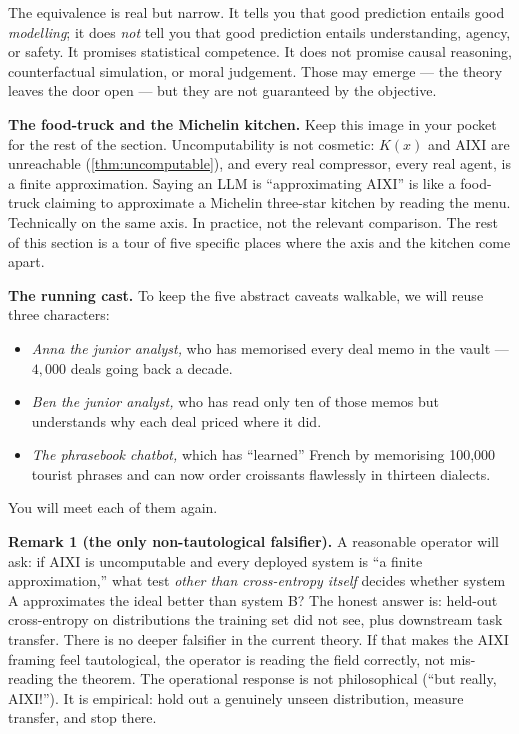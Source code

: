 \documentclass[12pt,a4paper]{article}
\theoremstyle{plain}
\theoremstyle{definition}
\begin{document}
\begin{intuition}
The equivalence is real but narrow. It tells you that good prediction
entails good \emph{modelling}; it does \emph{not} tell you that good
prediction entails understanding, agency, or safety. It promises
statistical competence. It does not promise causal reasoning,
counterfactual simulation, or moral judgement. Those may emerge ---
the theory leaves the door open --- but they are not guaranteed by
the objective.

\medskip

\noindent\textbf{The food-truck and the Michelin kitchen.} Keep this
image in your pocket for the rest of the section. Uncomputability is
not cosmetic: $K(x)$ and AIXI are unreachable
(\cref{thm:uncomputable}), and every real compressor, every real
agent, is a finite approximation. Saying an LLM is
``approximating AIXI'' is like a food-truck claiming to approximate
a Michelin three-star kitchen by reading the menu. Technically on
the same axis. In practice, not the relevant comparison. The rest
of this section is a tour of five specific places where the axis
and the kitchen come apart.

\medskip

\noindent\textbf{The running cast.} To keep the five abstract
caveats walkable, we will reuse three characters:

\begin{itemize}[leftmargin=1.2em,itemsep=2pt]
  \item \emph{Anna the junior analyst,} who has memorised every deal
        memo in the vault --- $4{,}000$ deals going back a decade.
  \item \emph{Ben the junior analyst,} who has read only ten of those
        memos but understands why each deal priced where it did.
  \item \emph{The phrasebook chatbot,} which has ``learned'' French by
        memorising 100{,}000 tourist phrases and can now order
        croissants flawlessly in thirteen dialects.
\end{itemize}

You will meet each of them again.

\medskip

\noindent\textbf{Remark 1 (the only non-tautological falsifier).}
A reasonable operator will ask: if AIXI is uncomputable and every
deployed system is ``a finite approximation,'' what test \emph{other
than cross-entropy itself} decides whether system A approximates the
ideal better than system B? The honest answer is: held-out
cross-entropy on distributions the training set did not see, plus
downstream task transfer. There is no deeper falsifier in the
current theory. If that makes the AIXI framing feel tautological,
the operator is reading the field correctly, not mis-reading the
theorem. The operational response is not philosophical (``but
really, AIXI!''). It is empirical: hold out a genuinely unseen
distribution, measure transfer, and stop there.


\end{intuition}
\end{document}
